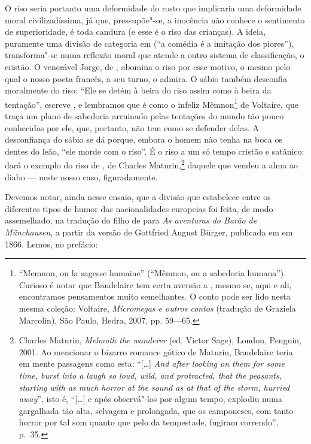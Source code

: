 O riso seria portanto uma deformidade do rosto que implicaria uma
deformidade moral civilizadíssima, já que, pressupõe"-se, a inocência
não conhece o sentimento de superioridade, é toda candura (e esse é o
riso das crianças). A ideia, puramente uma divisão de categoria em
 (“a comédia é a imitação dos piores”), transforma"-se numa
reflexão moral que atende a outro sistema de classificação, o cristão.
O venerável Jorge, de , abomina o riso por esse motivo, o mesmo pelo
qual o nosso poeta francês, a seu turno, o admira. O sábio também
desconfia moralmente do riso: “Ele se detém à beira do riso assim como
à beira da tentação”, escreve , e lembramos que é como o
infeliz Mêmnon\footnote{ “Memnon, ou la sagesse humaine” (``Mêmnon, ou a
sabedoria humana''). Curioso é notar que Baudelaire tem certa aversão a
, mesmo se, aqui e ali, encontramos pensamentos muito
semelhantes. O conto pode ser lido nesta mesma
coleção: Voltaire, \textit{Micromegas e outros contos} (tradução de
Graziela Marcolin), São Paulo, Hedra, 2007, pp. 59---65.} de Voltaire,
que traça um plano de sabedoria arruinado pelas tentações do mundo tão
pouco conhecidas por ele, que, portanto, não tem como se defender
delas. A desconfiança do sábio se dá porque, embora o homem não tenha
na boca os dentes do leão, “ele morde com o riso”. É o riso a um só
tempo cristão e satânico:  dará o exemplo do riso de ,
de Charles Maturin,\footnote{ Charles Maturin, \textit{Melmoth the 		
wanderer} (ed. Victor Sage), London, Penguin, 2001. Ao mencionar o
bizarro romance gótico de Maturin, Baudelaire teria em mente passagens
como esta: ``[\ldots] \textit{And after looking on them for some time, burst into
a laugh so loud, wild, and protracted, that the peasants, starting with
as much horror at the sound as at that of the storm, hurried away}'', isto é,  “[\ldots] e
após observá"-los por algum tempo, explodiu numa gargalhada tão alta,
selvagem e prolongada, que os camponeses, com tanto horror por tal som
quanto que pelo da tempestade, fugiram correndo”, p.~35.} daquele que
vendeu a alma ao diabo --- neste nosso caso, figuradamente.

Devemos notar, ainda nesse ensaio, que a divisão que 
estabelece entre os diferentes tipos de humor das nacionalidades
europeias foi feita, de modo assemelhado, na tradução do filho de
 para \textit{As aventuras do Barão de Münchausen}, a
partir da versão de Gottfried August Bürger, publicada em  em			
1866. Lemos, no prefácio:

